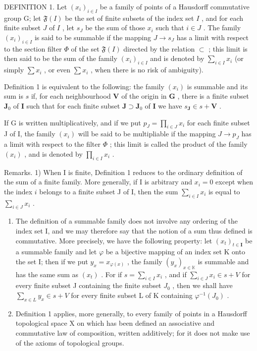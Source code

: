 DEFINITION 1. Let \((x_{i})_{i\in I}\) be a family of points of a Hausdorff commutative group G; let \(\mathfrak{F}(I)\) be the set of finite subsets of the index set \(I\) , and for each finite subset \(J\) of \(I\) , let \(s_J\) be the sum of those \(x_{i}\) such that \(i\in J\) . The family \((x_{i})_{i\in I}\) is said to be summable if the mapping \(J\to s_J\) has a limit with respect to the section filter \(\Phi\) of the set \(\mathfrak{F}(I)\) directed by the relation \(\subset\) ; this limit is then said to be the sum of the family \((x_{i})_{i\in I}\) and is denoted by \(\sum_{i\in I}x_{i}\) (or simply \(\sum x_{i}\) , or even \(\sum x_{i}\) , when there is no risk of ambiguity).

Definition 1 is equivalent to the following: the family \((x_{i})\) is summable and its sum is \(s\) if, for each neighbourhood \(\mathbf{V}\) of the origin in \(\mathbf{G}\) , there is a finite subset \(\mathbf{J}_0\) of \(\mathbf{I}\) such that for each finite subset \(\mathbf{J} \supset \mathbf{J}_0\) of \(\mathbf{I}\) we have \(s_{\mathbf{J}} \in s + \mathbf{V}\) .

If G is written multiplicatively, and if we put \(p_{J} = \prod_{i \in J} x_i\) for each finite subset J of I, the family \((x_i)\) will be said to be multipliable if the mapping \(J \to p_J\) has a limit with respect to the filter \(\Phi\) ; this limit is called the product of the family \((x_i)\) , and is denoted by \(\prod_{i \in I} x_i\) .

Remarks. 1) When I is finite, Definition 1 reduces to the ordinary definition of the sum of a finite family. More generally, if I is arbitrary and \(x_{i} = 0\) except when the index \(i\) belongs to a finite subset J of I, then the sum \(\sum_{i \in I} x_{i}\) is equal to \(\sum_{i \in J} x_{i}\) .

\begin{enumerate}
\def\labelenumi{\arabic{enumi})}
\setcounter{enumi}{1}
\item
  The definition of a summable family does not involve any ordering of the index set I, and we may therefore say that the notion of a sum thus defined is commutative. More precisely, we have the following property: let \((x_{t})_{t\in \mathbf{I}}\) be a summable family and let \(\varphi\) be a bijective mapping of an index set K onto the set I; then if we put \(y_{x} = x_{\varphi (x)}\) , the family \((y_{x})_{x\in \mathbb{K}}\) is summable and has the same sum as \((x_{t})\) . For if \(s = \sum_{i\in I}x_i\) , and if \(\sum_{i\in J}x_i\in s + V\) for every finite subset J containing the finite subset \(J_0\) , then we shall have \(\sum_{x\in L}y_x\in s + V\) for every finite subset L of K containing \(\varphi^{-1}(J_0)\) .
\item
  Definition 1 applies, more generally, to every family of points in a Hausdorff topological space X on which has been defined an associative and commutative law of composition, written additively; for it does not make use of the axioms of topological groups.
\end{enumerate}

